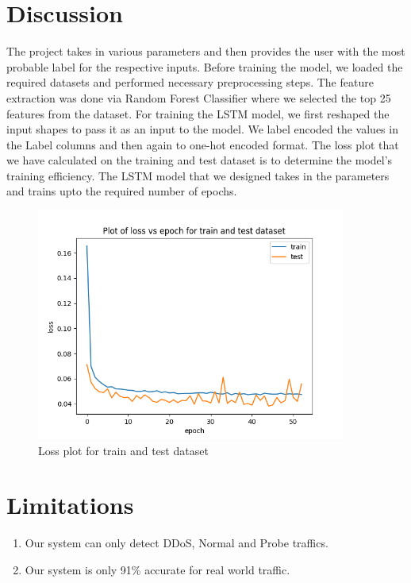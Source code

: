 \section{Discussion}
\vspace{-18pt}
The project takes in various parameters and then provides the user with the most probable label for the respective inputs. Before training the model, we loaded the required datasets and performed necessary preprocessing steps. The feature extraction was done via Random Forest Classifier where we selected the top 25 features from the dataset. For training the LSTM model, we first reshaped the input shapes to pass it as an input to the model. We label encoded the values in the Label columns and then again to one-hot encoded format. The loss plot that we have calculated on the training and test dataset is to determine the model's training efficiency. The LSTM model that we designed takes in the parameters and trains upto the required number of epochs. 
\begin{figure}[tbhh]
	\begin{center}
		\includegraphics[width=4in]{images/lstm_multi_loss.png} 
		\caption{Loss plot for train and test dataset} %
		\label{Loss plot for train and test dataset} %
	\end{center}
\end{figure}
\section{Limitations}
\begin{enumerate}[label=\roman*.]
	\item Our system can only detect DDoS, Normal and Probe traffics.
	\item Our system is only 91\% accurate for real world traffic.
\end{enumerate}
